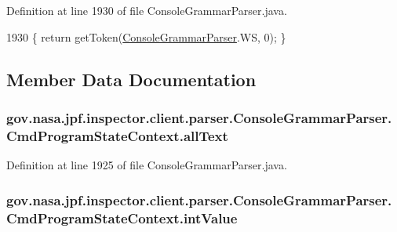 Definition at line 1930 of file Console\+Grammar\+Parser.\+java.


\begin{DoxyCode}
1930 \{ \textcolor{keywordflow}{return} getToken(\hyperlink{classgov_1_1nasa_1_1jpf_1_1inspector_1_1client_1_1parser_1_1_console_grammar_parser_a03e28f396e991cff9d014f357ae220f3}{ConsoleGrammarParser}.WS, 0); \}
\end{DoxyCode}


\subsection{Member Data Documentation}
\subsubsection[{\texorpdfstring{all\+Text}{allText}}]{ gov.\+nasa.\+jpf.\+inspector.\+client.\+parser.\+Console\+Grammar\+Parser.\+Cmd\+Program\+State\+Context.\+all\+Text}\hypertarget{classgov_1_1nasa_1_1jpf_1_1inspector_1_1client_1_1parser_1_1_console_grammar_parser_1_1_cmd_program_state_context_a18be044aaafd91e2510e144d6b5f6274}{}\label{classgov_1_1nasa_1_1jpf_1_1inspector_1_1client_1_1parser_1_1_console_grammar_parser_1_1_cmd_program_state_context_a18be044aaafd91e2510e144d6b5f6274}


Definition at line 1925 of file Console\+Grammar\+Parser.\+java.

\subsubsection[{\texorpdfstring{int\+Value}{intValue}}]{ gov.\+nasa.\+jpf.\+inspector.\+client.\+parser.\+Console\+Grammar\+Parser.\+Cmd\+Program\+State\+Context.\+int\+Value}\hypertarget{classgov_1_1nasa_1_1jpf_1_1inspector_1_1client_1_1parser_1_1_console_grammar_parser_1_1_cmd_program_state_context_a809f32fc3fdb98322943d1574c4bd90c}{}\label{classgov_1_1nasa_1_1jpf_1_1inspector_1_1client_1_1parser_1_1_console_grammar_parser_1_1_cmd_program_state_context_a809f32fc3fdb98322943d1574c4bd90c}


